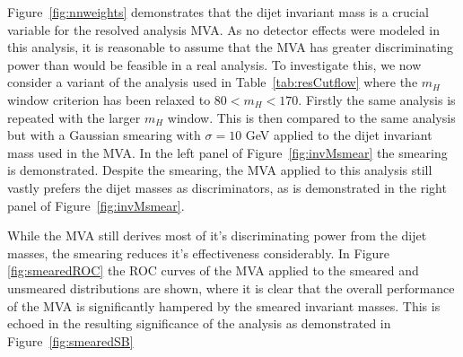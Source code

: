 Figure~\ref{fig:nnweights} demonstrates that the dijet invariant mass is a crucial variable for the resolved analysis MVA. As no detector effects were modeled in this analysis, it is reasonable to assume that the MVA has greater discriminating power than would be feasible in a real analysis. To investigate this, we now consider a variant of the analysis used in Table~\ref{tab:resCutflow} where the $m_H$ window criterion has been relaxed to $80 < m_H < 170$. Firstly the same analysis is repeated with the larger $m_H$ window. This is then compared to the same analysis but with a Gaussian smearing with $\sigma=10$ GeV applied to the dijet invariant mass used in the MVA. In the left panel of Figure~\ref{fig:invMsmear} the smearing is demonstrated. Despite the smearing, the MVA applied to this analysis still vastly prefers the dijet masses as discriminators, as is demonstrated in the right panel of Figure~\ref{fig:invMsmear}.
  

While the MVA still derives most of it's discriminating power from the dijet masses, the smearing reduces it's effectiveness considerably. In Figure \ref{fig:smearedROC} the ROC curves of the MVA applied to the smeared and unsmeared distributions are shown, where it is clear that the overall performance of the MVA is significantly hampered by the smeared invariant masses. This is echoed in the resulting significance of the analysis as demonstrated in Figure~\ref{fig:smearedSB}
